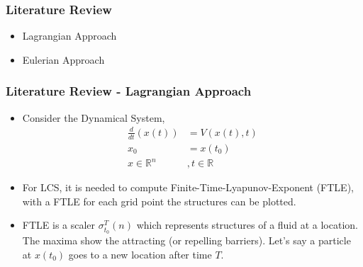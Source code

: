 \documentclass[../presentation.tex]{subfiles}
\begin{document}
\begin{frame}
  \frametitle{Literature Review}

  \begin{itemize}
    \setlength\itemsep{5em}
    \item Lagrangian Approach
    \item Eulerian Approach
  \end{itemize}
\end{frame}

\begin{frame}
  \frametitle{Literature Review - Lagrangian Approach}

  \begin{itemize}
    \item Consider the Dynamical System,
    \begin{equation}
      \begin{aligned}
        \frac{d}{dt}(x(t)) &= V(x(t), t) \\
        x_0 &= x(t_0) \\
        x \in \mathbb{R}^n &, t \in \mathbb{R}
      \end{aligned}
    \end{equation}
  
    \item For LCS, it is needed to compute Finite-Time-Lyapunov-Exponent (FTLE), with a FTLE for each grid point the structures can be plotted.
    
    \item FTLE is a scaler \(\sigma_{t_0}^T(n)\) which represents structures of a fluid at a location. The maxima show the attracting (or repelling barriers). Let's say a particle at \(x(t_0)\) goes to a new location after time \(T\). 
  \end{itemize}
\end{frame}
\end{document}

